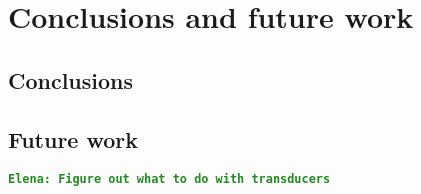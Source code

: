 \documentclass[12pt]{article}
\newcommand{\comment}[1]{{\bf \tt  {#1}}}
\newcommand{\emcomment}[1]{\textcolor{ForestGreen}{\comment{Elena: {#1}}}}
\begin{document}
	
	
	

\section{Conclusions and future work}
	\subsection{Conclusions}
	\subsection{Future work}
\emcomment{Figure out what to do with transducers}
	


\end{document}
